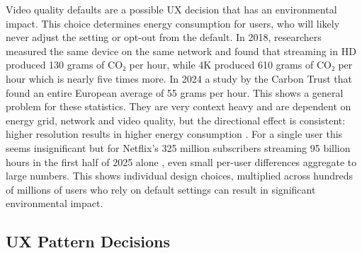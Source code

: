 \par Video quality defaults are a possible UX decision that has an environmental impact. This choice determines energy consumption for users, who will likely never adjust the setting or opt-out from the default. In 2018, researchers measured the same device on the same network and found that streaming in HD produced 130 grams of CO₂ per hour, while 4K produced 610 grams of CO₂ per hour which is nearly five times more. In 2024 a study by the Carbon Trust that found an entire European average of 55 grams per hour. This shows a general problem for these statistics. They are very context heavy and are dependent on energy grid, network and video quality, but the directional effect is consistent: higher resolution results in higher energy consumption \cite{2018Report, CarbonTrust2021Streaming}. For a single user this seems insignificant but for Netflix's 325 million subscribers streaming 95 billion hours in the first half of 2025 alone \cite{Netflix2025H1, Netflix2025Q4}, even small per-user differences aggregate to large numbers. This shows individual design choices, multiplied across hundreds of millions of users who rely on default settings can result in significant environmental impact.

\subsection{UX Pattern Decisions}


